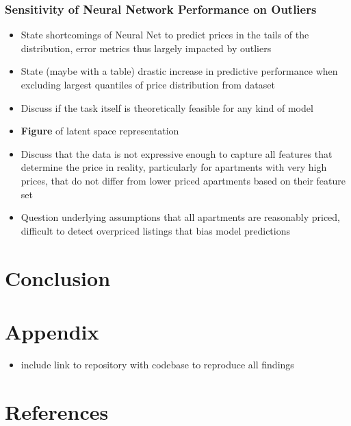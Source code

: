 \documentclass[12pt, letterpaper]{article}
\begin{document}
\subsubsection{Sensitivity of Neural Network Performance on Outliers} %
\begin{itemize}
    \item State shortcomings of Neural Net to predict prices in the tails of the distribution, error metrics thus largely impacted by outliers
    \item State (maybe with a table) drastic increase in predictive performance when excluding largest quantiles of price distribution from dataset
    \item Discuss if the task itself is theoretically feasible for any kind of model
    \item \textbf{Figure} of latent space representation
    \item Discuss that the data is not expressive enough to capture all features that determine the price in reality, particularly for apartments with very high prices, that do not differ from lower priced apartments based on their feature set
    \item Question underlying assumptions that all apartments are reasonably priced, difficult to detect overpriced listings that bias model predictions
\end{itemize}


\section{Conclusion} %


\section{Appendix}
\begin{itemize}
    \item include link to repository with codebase to reproduce all findings
\end{itemize}


\section{References}
\end{document}
